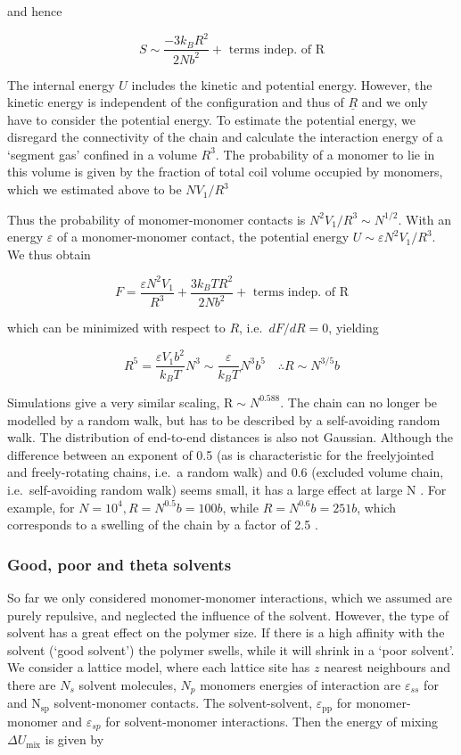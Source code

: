 \documentclass[
  letterpaper,
  DIV=11,
  numbers=noendperiod]{scrartcl}
\begin{document}
and hence

\[
S \sim \frac{-3 k_{B} R^{2}}{2 N b^{2}}+\text { terms indep. of } \mathrm{R}
\]

The internal energy \(U\) includes the kinetic and potential energy.
However, the kinetic energy is independent of the configuration and thus
of \(\underline{R}\) and we only have to consider the potential energy.
To estimate the potential energy, we disregard the connectivity of the
chain and calculate the interaction energy of a `segment gas' confined
in a volume \(R^{3}\). The probability of a monomer to lie in this
volume is given by the fraction of total coil volume occupied by
monomers, which we estimated above to be \(N V_{1} / R^{3}\)

Thus the probability of monomer-monomer contacts is
\(N^{2} V_{1} / R^{3} \sim N^{1 / 2}\). With an energy \(\varepsilon\)
of a monomer-monomer contact, the potential energy
\(U \sim \varepsilon N^{2} V_{1} / R^{3}\). We thus obtain

\[
F=\frac{\varepsilon N^{2} V_{1}}{R^{3}}+\frac{3 k_{B} T R^{2}}{2 N b^{2}}+\text { terms indep. of } \mathrm{R}
\]

which can be minimized with respect to \(R\), i.e.~\(d F / d R=0\),
yielding

\[
R^{5}=\frac{\varepsilon V_{1} b^{2}}{k_{B} T} N^{3} \sim \frac{\varepsilon}{k_{B} T} N^{3} b^{5} \quad \therefore R \sim N^{3 / 5} b
\]

Simulations give a very similar scaling, \(\mathrm{R} \sim N^{0.588}\).
The chain can no longer be modelled by a random walk, but has to be
described by a self-avoiding random walk. The distribution of end-to-end
distances is also not Gaussian. Although the difference between an
exponent of 0.5 (as is characteristic for the freelyjointed and
freely-rotating chains, i.e.~a random walk) and 0.6 (excluded volume
chain, i.e.~self-avoiding random walk) seems small, it has a large
effect at large N . For example, for \(N=10^{4}, R=N^{0.5} b=100 b\),
while \(R=N^{0.6} b=251 b\), which corresponds to a swelling of the
chain by a factor of 2.5 .

\subsubsection{Good, poor and theta
solvents}\label{good-poor-and-theta-solvents}

So far we only considered monomer-monomer interactions, which we assumed
are purely repulsive, and neglected the influence of the solvent.
However, the type of solvent has a great effect on the polymer size. If
there is a high affinity with the solvent (`good solvent') the polymer
swells, while it will shrink in a `poor solvent'. We consider a lattice
model, where each lattice site has \(z\) nearest neighbours and there
are \(N_{s}\) solvent molecules, \(N_{p}\) monomers energies of
interaction are \(\varepsilon_{s s}\) for and
\(\mathrm{N}_{\mathrm{sp}}\) solvent-monomer contacts. The
solvent-solvent, \(\varepsilon_{\mathrm{pp}}\) for monomer- monomer and
\(\varepsilon_{s p}\) for solvent-monomer interactions. Then the energy
of mixing \(\Delta U_{\operatorname{mix}}\) is given by
\end{document}
